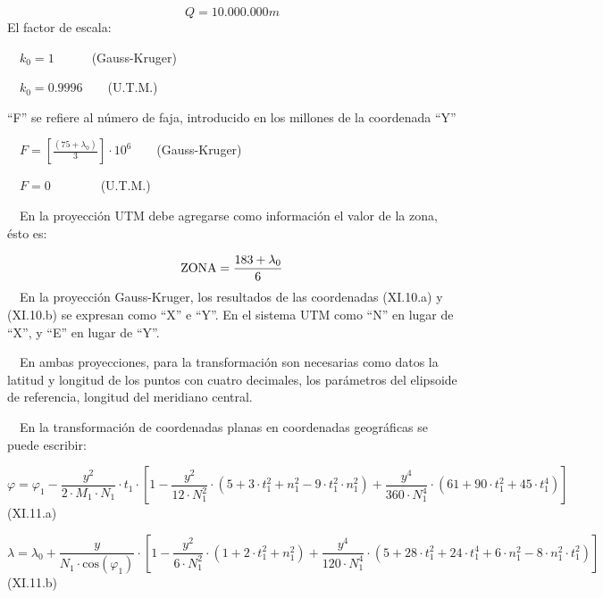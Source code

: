 \documentclass{tufte-book}
\newcommand\normalsubformula[1]{\text{\mathversion{normal}$#1$}}
\begin{document}
\begin{equation*}
{Q=\text{10}\text{.}\text{000}\text{.}\text{000}m}
\end{equation*}
El factor de escala:

\ \  ${k_{{0}}=1}$\ \ \ \ \ \ (Gauss-Kruger)  

\ \  ${k_{{0}}=0\text{.}\text{9996}}$\ \ \ \ (U.T.M.)

{\textquotedblleft}F{\textquotedblright} se refiere al número de faja,
introducido en los millones de la coordenada
{\textquotedblleft}Y{\textquotedblright}

\ \  ${F=\left[\frac{\left(\text{75}+\lambda
_{{0}}\right)}{3}\right]\cdot \text{10}^{{6}}}$\ \ \ \ (Gauss-Kruger)

\ \  ${F=0}$\ \ \ \ \ \ \ \ (U.T.M.)

\ \ En la proyección UTM debe agregarse como información el valor de
la zona, ésto  es:

\begin{equation*}
{\normalsubformula{\text{ZONA}}=\frac{\text{183}+\lambda _{{0}}}{6}}
\end{equation*}
\ \ En la proyección Gauss-Kruger, los resultados de las coordenadas
(XI.10.a) y (XI.10.b) se expresan como
{\textquotedblleft}X{\textquotedblright} e
{\textquotedblleft}Y{\textquotedblright}. En el sistema UTM como
{\textquotedblleft}N{\textquotedblright} en lugar de
{\textquotedblleft}X{\textquotedblright}, y
{\textquotedblleft}E{\textquotedblright} en lugar de
{\textquotedblleft}Y{\textquotedblright}.

\ \ En ambas proyecciones, para la transformación son necesarias como
datos la latitud y longitud de los puntos con cuatro decimales, los
parámetros del elipsoide de referencia, longitud del meridiano
central.

\ \ En la transformación de coordenadas planas en coordenadas
geográficas se puede escribir:

\begin{equation*}
{\varphi =\varphi _{{1}}-\frac{y^{{2}}}{2\cdot M_{{1}}\cdot
N_{{1}}}\cdot t_{{1}}\cdot \left[1-\frac{y^{{2}}}{\text{12}\cdot
N_{{1}}^{{2}}}\cdot \left(5+3\cdot t_{{1}}^{{2}}+n_{{1}}^{{2}}-9\cdot
t_{{1}}^{{2}}\cdot n_{{1}}^{{2}}\right)+\frac{y^{{4}}}{\text{360}\cdot
N_{{1}}^{{4}}}\cdot \left(\text{61}+\text{90}\cdot
t_{{1}}^{{2}}+\text{45}\cdot t_{{1}}^{{4}}\right)\right]}
\end{equation*}
(XI.11.a)

\begin{equation*}
{\lambda =\lambda _{{0}}+\frac{y}{N_{{1}}\cdot \text{cos}\left(\varphi
_{{1}}\right)}\cdot \left[1-\frac{y^{{2}}}{6\cdot N_{{1}}^{{2}}}\cdot
\left(1+2\cdot
t_{{1}}^{{2}}+n_{{1}}^{{2}}\right)+\frac{y^{{4}}}{\text{120}\cdot
N_{{1}}^{{4}}}\cdot \left(5+\text{28}\cdot t_{{1}}^{{2}}+\text{24}\cdot
t_{{1}}^{{4}}+6\cdot n_{{1}}^{{2}}-8\cdot n_{{1}}^{{2}}\cdot
t_{{1}}^{{2}}\right)\right]}
\end{equation*}
(XI.11.b)
\end{document}
